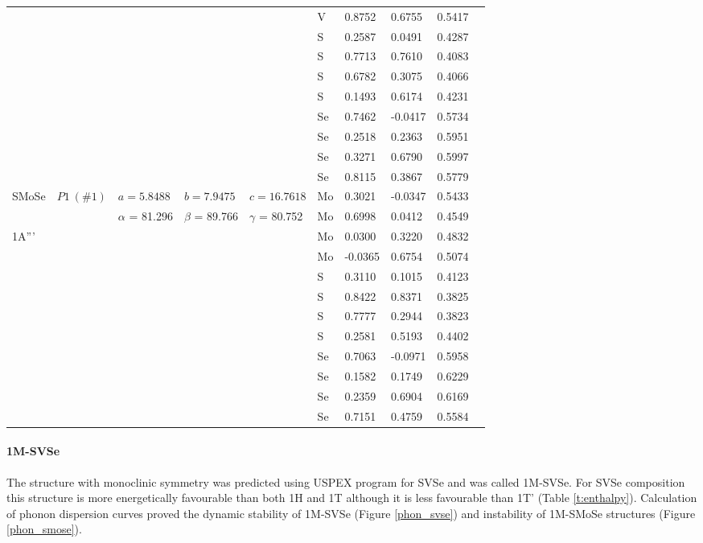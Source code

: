 \documentclass[a4paperm]{article}
\begin{document}
\begin{longtable}[c]{l*{9}{l}}
	&&&&&	V	&	0.8752	&	0.6755	&	0.5417	\\
	&&&&&	S	&	0.2587	&	0.0491	&	0.4287	\\
	&&&&&	S	&	0.7713	&	0.7610	&	0.4083	\\
	&&&&&	S	&	0.6782	&	0.3075	&	0.4066	\\
	&&&&&	S	&	0.1493	&	0.6174	&	0.4231	\\
	&&&&&	Se	&	0.7462	&	-0.0417	&	0.5734	\\
	&&&&&	Se	&	0.2518	&	0.2363	&	0.5951	\\
	&&&&&	Se	&	0.3271	&	0.6790	&	0.5997	\\
	&&&&&	Se	&	0.8115	&	0.3867	&	0.5779	\\
	\hline
	SMoSe & $P1\ (\#1)$  &	$a=5.8488$ & $b=7.9475$ & $c=16.7618$  & Mo	&	0.3021	&	-0.0347	&	0.5433	\\
	&&$\alpha$ = 81.296& $\beta$ = 89.766& $\gamma$ = 80.752  & Mo	&	0.6998	&	0.0412	&	0.4549	\\		
	1A'''&&&&&	Mo	&	0.0300	&	0.3220	&	0.4832	\\
	&&&&&	Mo	&	-0.0365	&	0.6754	&	0.5074	\\
	&&&&&	S	&	0.3110	&	0.1015	&	0.4123	\\
	&&&&&	S	&	0.8422	&	0.8371	&	0.3825	\\
	&&&&&	S	&	0.7777	&	0.2944	&	0.3823	\\
	&&&&&	S	&	0.2581	&	0.5193	&	0.4402	\\
	&&&&&	Se	&	0.7063	&	-0.0971	&	0.5958	\\
	&&&&&	Se	&	0.1582	&	0.1749	&	0.6229	\\
	&&&&&	Se	&	0.2359	&	0.6904	&	0.6169	\\
	&&&&&	Se	&	0.7151	&	0.4759	&	0.5584	\\
	\hline
\end{longtable}




\paragraph{1M-SVSe}


The structure with monoclinic symmetry was predicted using USPEX program for SVSe and was called 1M-SVSe. 
For SVSe composition this structure is more energetically favourable than both 1H and 1T although it is less favourable than 1T' 
(Table \ref{t:enthalpy}).
Calculation of phonon dispersion curves proved the dynamic stability of 1M-SVSe (Figure \ref{phon_svse}) and instability of 1M-SMoSe structures (Figure \ref{phon_smose}).
\end{document}
